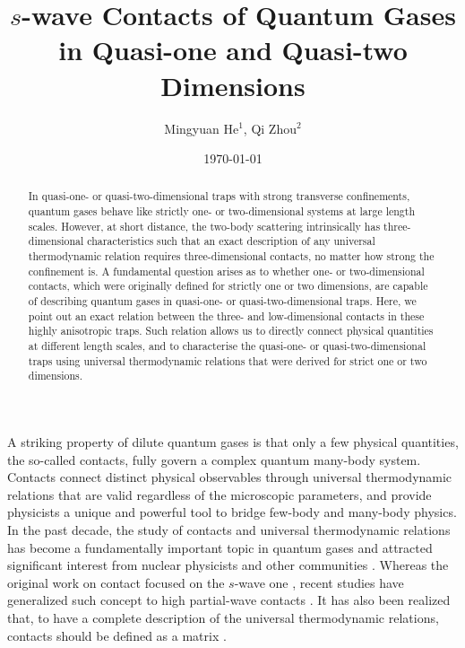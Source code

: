 \documentclass[twocolumn, prl]{revtex4}
\begin{document}
\title{$s$-wave Contacts of Quantum Gases in Quasi-one and Quasi-two Dimensions}
\author{Mingyuan He$^1$, Qi Zhou$^2$}
\date{\today}
\begin{abstract}

In quasi-one- or quasi-two-dimensional traps with strong transverse confinements, quantum gases behave like strictly one- or two-dimensional systems at large length scales. However, at short distance, the two-body scattering intrinsically has three-dimensional characteristics such that an exact description of any universal thermodynamic relation requires three-dimensional contacts, no matter how strong the confinement is. A fundamental question arises as to whether one- or two-dimensional contacts, which were originally defined for strictly one or two dimensions, are capable of describing quantum gases in quasi-one- or quasi-two-dimensional traps. Here, we point out an exact relation between the three- and low-dimensional contacts in these highly anisotropic traps. Such relation allows us to directly connect physical quantities at different length scales, and to characterise the quasi-one- or quasi-two-dimensional traps using universal thermodynamic relations that were derived for strict one or two dimensions.

\end{abstract}

\maketitle


A striking property of dilute quantum gases is that only a few physical quantities, the so-called contacts, fully govern a complex quantum many-body system. Contacts connect distinct physical observables through universal thermodynamic relations that are valid regardless of the microscopic parameters, and provide physicists a unique and powerful tool to bridge few-body and many-body physics. In the past decade, the study of contacts and universal thermodynamic relations has become a fundamentally important topic in quantum gases \cite{ Tan1,Tan2,Tan3,V1,V2,V3,V4,V5,Vale,Jin1,Jin2,Jin3,T1, T2,T3, T4,T5,Zhou,Drut} and attracted significant interest from nuclear physicists and other communities \cite{N1,N2,N3}. Whereas the original work on contact focused on the $s$-wave one \cite{Tan1,Tan2,Tan3}, recent studies have generalized such concept to high partial-wave contacts \cite{P1,P2,Zhou1,P3, P4,Cui}. It has also been realized that, to have a complete description of the universal thermodynamic relations, contacts should be defined as a matrix \cite{Zhou2,P5}. 
\end{document}
